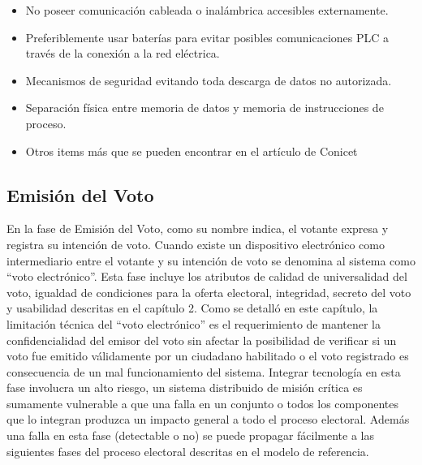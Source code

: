     \begin{itemize}
        \item No poseer comunicación cableada o inalámbrica accesibles externamente.
        \item Preferiblemente usar baterías para evitar posibles comunicaciones PLC a través de la conexión a la red eléctrica.
        \item Mecanismos de seguridad evitando toda descarga de datos no autorizada.
        \item Separación física entre memoria de datos y memoria de instrucciones de proceso.
        \item Otros items más que se pueden encontrar en el artículo de Conicet \cite{conicet}
    \end{itemize}
\subsection{Emisión del Voto} 
En la fase de Emisión del Voto, como su nombre indica, el votante expresa y registra su intención de voto. Cuando existe un dispositivo electrónico como intermediario entre el votante y su intención de voto se denomina al sistema como ``voto electrónico''. Esta fase incluye los atributos de calidad de universalidad del voto, igualdad de condiciones para la oferta electoral, integridad, secreto del voto y usabilidad descritas en el capítulo 2. Como se detalló en este capítulo, la limitación técnica del ``voto electrónico'' es el requerimiento de mantener la confidencialidad del emisor del voto sin afectar la posibilidad de verificar si un voto fue emitido válidamente por un ciudadano habilitado o el voto registrado es consecuencia de un mal funcionamiento del sistema. Integrar tecnología en esta fase involucra un alto riesgo, un sistema distribuido de misión crítica es sumamente vulnerable a que una falla en un conjunto o todos los componentes que lo integran produzca un impacto general a todo el proceso electoral. Además una falla en esta fase (detectable o no) se puede propagar fácilmente a las siguientes fases del proceso electoral descritas en el modelo de referencia. 


